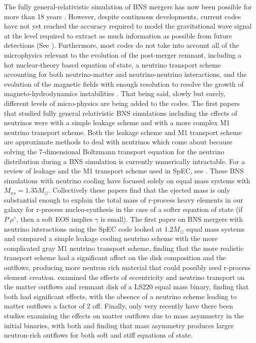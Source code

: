 The fully general-relativistic simulation of BNS mergers has now been possible for more than 18 years \cite{shibata2000simulation}. However, despite continuous developments, current codes have not yet reached the accuracy required to model the gravitational wave signal at the level required to extract as much information as possible from future detections (See \cite{barkett2015gravitational}). Furthermore, most codes do not take into account all of the microphysics relevant to the evolution of the post-merger remnant, including a hot nuclear-theory based equation of state, a neutrino transport scheme accounting for both neutrino-matter and neutrino-neutrino interactions, and the evolution of the magnetic fields with enough resolution to resolve the growth of magneto-hydrodynamics instabilities \cite{foucart2015low}. That being said, slowly but surely, different levels of micro-physics are being added to the codes. The first papers that studied fully general relativistic BNS simulations including the effects of neutrinos
were \cite{neilsen2014magnetized, palenzuela2015effects} with a simple leakage scheme and \cite{sekiguchi2015dynamical} with a more complex M1 neutrino transport scheme. Both the leakage scheme and M1 transport scheme are approximate methods to deal with neutrinos which come about because solving the 7-dimensional Boltzmann transport equation for the neutrino distribution during a BNS simulation is currently numerically intractable. For a review of leakage and the M1 transport scheme used in SpEC, see \cite{foucart2015post}. These BNS simulations with neutrino cooling have focused solely on equal mass systems with $M_{ns} = 1.35M_{\odot}$. Collectively these papers find that the ejected mass is only substantial  enough to explain the total mass of r-process heavy elements in our galaxy for r-process nucleo-synthesis in the case of a softer equation of state (if $P ~ \rho^{\gamma}$, then a soft EOS implies $\gamma$ is small). The first paper on BNS mergers with neutrino interactions using the SpEC code looked at $1.2M_{\odot}$ equal mass systems and compared a simple leakage cooling neutrino scheme with the more complicated gray M1 neutrino transport scheme, finding that the more realistic transport scheme had a significant affect on the disk composition and the outflows, producing more neutron rich material that could possibly seed r-process element creation. \cite{radice2016dynamical} examined the effects of eccentricity and neutrino transport on the matter outflows and remnant disk of a LS220 equal mass binary, finding that both had significant effects, with the absence of a neutrino scheme leading to matter outflows a factor of 2 off. Finally, only very recently have there been studies examining the effects on matter outflows due to mass asymmetry in the initial binaries, with both \cite{lehner2016unequal} and \cite{sekiguchi2016dynamical} finding that mass asymmetry produces larger neutron-rich outflows for both soft and stiff equations of state.

